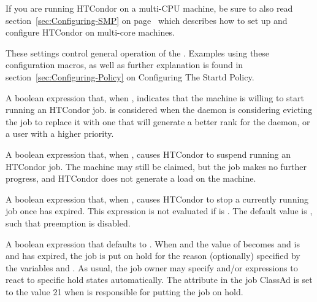 \Note If you are running HTCondor on a multi-CPU machine, be sure
to also read section~\ref{sec:Configuring-SMP} on
page~\pageref{sec:Configuring-SMP} which describes how to set up and
configure HTCondor on multi-core machines.

These settings control general operation of the .
Examples using these configuration macros,
as well as further explanation is found in
section~\ref{sec:Configuring-Policy} on
Configuring The Startd Policy.

\begin{description}

\label{param:Start}
\item[\Macro{START}]
  A boolean expression
  that, when , indicates that the machine is willing
  to start running an HTCondor job.
   is considered when the  daemon
  is considering evicting the job to replace it with one that will
  generate a better rank for the  daemon,
  or a user with a higher priority.

\label{param:Suspend}
\item[\Macro{SUSPEND}]
  A boolean expression that, when ,
  causes HTCondor to suspend running an HTCondor job.
  The machine may still be claimed, but the job makes no further
  progress, and HTCondor does not generate a load on the machine.

\label{param:Preempt}
\item[\Macro{PREEMPT}]
  A boolean expression that, when ,
  causes HTCondor to stop a currently running job once
   has expired.  This expression is not
  evaluated if  is .
  The default value is , such that preemption is disabled.

\label{param:WantHold}
\item[\Macro{WANT\_HOLD}]
  A boolean expression that defaults to .
  When  and the value of  becomes 
  and  is  and 
  has expired,
  the job is put on hold for the reason
  (optionally) specified by the variables  and
  .
  As usual, the job owner may specify
   and/or 
  expressions to react to specific hold states automatically.
  The attribute  in the job ClassAd is set to 
  the value 21 when
   is responsible for putting the job on hold.


\end{description}
